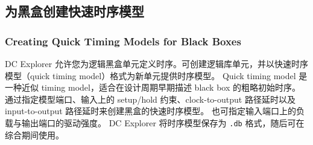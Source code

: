 \subsection{为黑盒创建快速时序模型}
\subsubsection*{Creating Quick Timing Models for Black Boxes}

DC Explorer 允许您为逻辑黑盒单元定义时序。可创建逻辑库单元，并以快速时序模型（quick timing model）格式为新单元提供时序模型。
Quick timing model 是一种近似 timing model，适合在设计周期早期描述 black box 的粗略初始时序。
通过指定模型端口、输入上的 setup/hold 约束、clock-to-output 路径延时以及 input-to-output 路径延时来创建黑盒的快速时序模型。
也可指定输入端口上的负载与输出端口的驱动强度。
DC Explorer 将时序模型保存为 \texttt{.db} 格式，随后可在综合期间使用。

